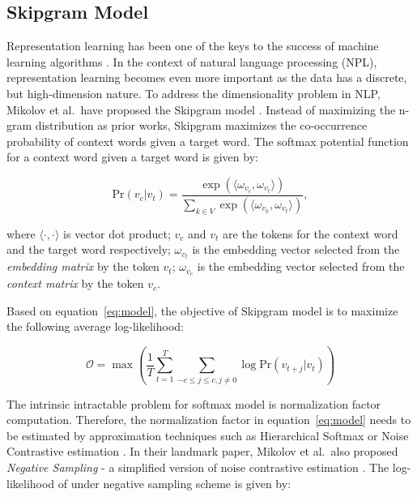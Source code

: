\documentclass[letterpaper]{article}
\begin{document}
        \subsection{Skipgram Model}
            Representation learning has been one of the keys to the success of machine learning 
            algorithms \cite{bengioreprev}. In the context of natural language processing (NPL),
            representation learning becomes even more important as the data has a discrete, but
            high-dimension nature. To address the dimensionality problem in NLP, Mikolov et al.\ have
            proposed the Skipgram model \cite{skipgram}. Instead of maximizing the n-gram distribution
            as prior works, Skipgram maximizes the co-occurrence probability of context words given a
            target word. The softmax potential function for a context word given a target 
            word is given by:

            \begin{equation}
                \label{eq:model}
                \mbox{Pr} (v_c | v_t) = \frac{\exp{( \langle \omega_{v_c} ,  \omega_{v_t} \rangle )}}{\sum_{k \in V} \exp{( \langle \omega_{v_k} ,  \omega_{v_t} \rangle )}},
            \end{equation}
            
            \noindent
            where $ \langle \cdot ,  \cdot \rangle $ is vector dot product; $ v_c $ and $ v_t $ are the
            tokens for the context word and the target word respectively; $\omega_{v_t}$ is the embedding
            vector selected from the \emph{embedding matrix} by the token $v_t$; $\omega_{v_c}$ is the
            embedding vector selected from the \emph{context matrix} by the token $v_c$.

            Based on equation~\ref{eq:model}, the objective of Skipgram model is to maximize the following
            average log-likelihood:

            \begin{equation}
                \label{eq:avgloglikelihood}
                \mathcal{O} = \max \left( \frac{1}{T} \sum_{t=1}^{T} \sum_{-c \leq j \leq c, j \neq 0} \log \mbox{Pr} (v_{t+j} | v_t) \right)
            \end{equation}

            The intrinsic intractable problem for softmax model is normalization factor computation. 
            Therefore, the normalization factor in equation~\ref{eq:model} needs to be estimated by 
            approximation techniques such as Hierarchical Softmax \cite{hs} or Noise Contrastive estimation
            \cite{nce}. In their landmark paper, Mikolov et al.\  also proposed \emph{Negative Sampling} - a 
            simplified version of noise contrastive estimation \cite{skipgram}. The log-likelihood of 
            under negative sampling scheme is given by:
\end{document}
